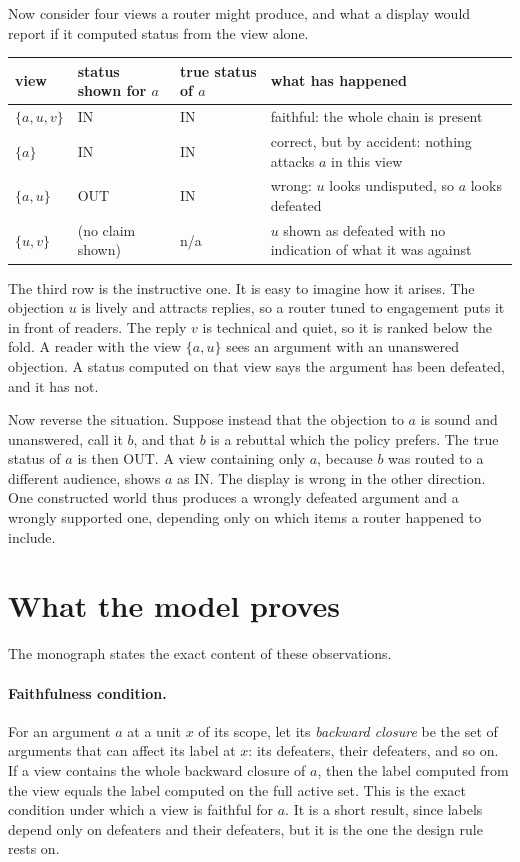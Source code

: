 \documentclass[11pt]{article}
\newcommand{\IN}{\textsf{IN}}
\newcommand{\OUT}{\textsf{OUT}}
\begin{document}
Now consider four views a router might produce, and what a display would report if it computed status from the view alone.

\begin{center}
\small
\begin{tabularx}{\textwidth}{@{}l l X X@{}}
\toprule
view & status shown for $a$ & true status of $a$ & what has happened\\
\midrule
$\{a,u,v\}$ & \IN{} & \IN{} & faithful: the whole chain is present\\
$\{a\}$ & \IN{} & \IN{} & correct, but by accident: nothing attacks $a$ in this view\\
$\{a,u\}$ & \OUT{} & \IN{} & wrong: $u$ looks undisputed, so $a$ looks defeated\\
$\{u,v\}$ & (no claim shown) & n/a & $u$ shown as defeated with no indication of what it was against\\
\bottomrule
\end{tabularx}
\end{center}

The third row is the instructive one. It is easy to imagine how it arises. The objection $u$ is lively and attracts replies, so a router tuned to engagement puts it in front of readers. The reply $v$ is technical and quiet, so it is ranked below the fold. A reader with the view $\{a,u\}$ sees an argument with an unanswered objection. A status computed on that view says the argument has been defeated, and it has not.

Now reverse the situation. Suppose instead that the objection to $a$ is sound and unanswered, call it $b$, and that $b$ is a rebuttal which the policy prefers. The true status of $a$ is then \OUT. A view containing only $a$, because $b$ was routed to a different audience, shows $a$ as \IN. The display is wrong in the other direction. One constructed world thus produces a wrongly defeated argument and a wrongly supported one, depending only on which items a router happened to include.

\section{What the model proves}\label{sec:proves}

The monograph states the exact content of these observations.

\paragraph{Faithfulness condition.} For an argument $a$ at a unit $x$ of its scope, let its \emph{backward closure} be the set of arguments that can affect its label at $x$: its defeaters, their defeaters, and so on. If a view contains the whole backward closure of $a$, then the label computed from the view equals the label computed on the full active set. This is the exact condition under which a view is faithful for $a$. It is a short result, since labels depend only on defeaters and their defeaters, but it is the one the design rule rests on.
\end{document}
